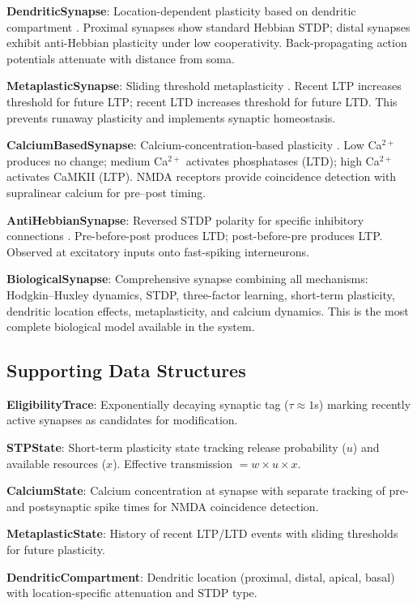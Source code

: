 \documentclass[11pt]{article}
\begin{document}
\textbf{DendriticSynapse}: Location-dependent plasticity based on dendritic compartment \citep{larkum2013cellular}. Proximal synapses show standard Hebbian STDP; distal synapses exhibit anti-Hebbian plasticity under low cooperativity. Back-propagating action potentials attenuate with distance from soma.

\textbf{MetaplasticSynapse}: Sliding threshold metaplasticity \citep{abraham1996metaplasticity}. Recent LTP increases threshold for future LTP; recent LTD increases threshold for future LTD. This prevents runaway plasticity and implements synaptic homeostasis.

\textbf{CalciumBasedSynapse}: Calcium-concentration-based plasticity \citep{graupner2012calcium}. Low Ca$^{2+}$ produces no change; medium Ca$^{2+}$ activates phosphatases (LTD); high Ca$^{2+}$ activates CaMKII (LTP). NMDA receptors provide coincidence detection with supralinear calcium for pre--post timing.

\textbf{AntiHebbianSynapse}: Reversed STDP polarity for specific inhibitory connections \citep{feldman2012spike}. Pre-before-post produces LTD; post-before-pre produces LTP. Observed at excitatory inputs onto fast-spiking interneurons.

\textbf{BiologicalSynapse}: Comprehensive synapse combining all mechanisms: Hodgkin--Huxley dynamics, STDP, three-factor learning, short-term plasticity, dendritic location effects, metaplasticity, and calcium dynamics. This is the most complete biological model available in the system.

\subsection{Supporting Data Structures}

\textbf{EligibilityTrace}: Exponentially decaying synaptic tag ($\tau \approx 1$s) marking recently active synapses as candidates for modification.

\textbf{STPState}: Short-term plasticity state tracking release probability ($u$) and available resources ($x$). Effective transmission $= w \times u \times x$.

\textbf{CalciumState}: Calcium concentration at synapse with separate tracking of pre- and postsynaptic spike times for NMDA coincidence detection.

\textbf{MetaplasticState}: History of recent LTP/LTD events with sliding thresholds for future plasticity.

\textbf{DendriticCompartment}: Dendritic location (proximal, distal, apical, basal) with location-specific attenuation and STDP type.
\end{document}
